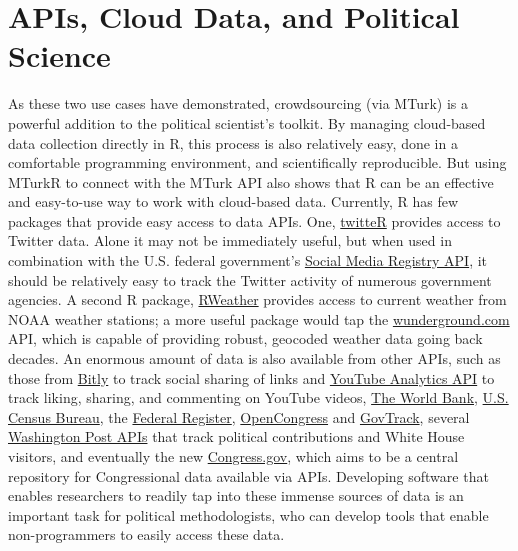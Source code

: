\documentclass[11pt]{article}
\begin{document}
\section{APIs, Cloud Data, and Political Science}

As these two use cases have demonstrated, crowdsourcing (via MTurk) is a powerful addition to the political scientist's toolkit. By managing cloud-based data collection directly in R, this process is also relatively easy, done in a comfortable programming environment, and scientifically reproducible. But using MTurkR to connect with the MTurk API also shows that R can be an effective and easy-to-use way to work with cloud-based data. Currently, R has few packages that provide easy access to data APIs. One, \href{http://cran.r-project.org/web/packages/twitteR/}{twitteR} provides access to Twitter data. Alone it may not be immediately useful, but when used in combination with the U.S. federal government's \href{http://www.usa.gov/About/developer-resources/social-media-registry.shtml}{Social Media Registry API}, it should be relatively easy to track the Twitter activity of numerous government agencies. A second R package, \href{http://cran.r-project.org/web/packages/RWeather/RWeather.pdf}{RWeather} provides access to current weather from NOAA weather stations; a more useful package would tap the \href{http://www.wunderground.com}{wunderground.com} API, which is capable of providing robust, geocoded weather data going back decades. An enormous amount of data is also available from other APIs, such as those from \href{http://dev.bitly.com/}{Bitly} to track social sharing of links and \href{https://developers.google.com/youtube/analytics/}{YouTube Analytics API} to track liking, sharing, and commenting on YouTube videos, \href{http://data.worldbank.org/developers}{The World Bank}, \href{http://www.census.gov/developers/}{U.S. Census Bureau}, the \href{https://www.federalregister.gov/blog/learn/developers}{Federal Register}, \href{http://www.opencongress.org/about/code}{OpenCongress} and \href{http://www.govtrack.us/developers}{GovTrack}, several \href{http://developer.washingtonpost.com/applications}{Washington Post APIs} that track political contributions and White House visitors, and eventually the new \href{Congress.gov}{Congress.gov}, which aims to be a central repository for Congressional data available via APIs. Developing software that enables researchers to readily tap into these immense sources of data is an important task for political methodologists, who can develop tools that enable non-programmers to easily access these data.
\end{document}
